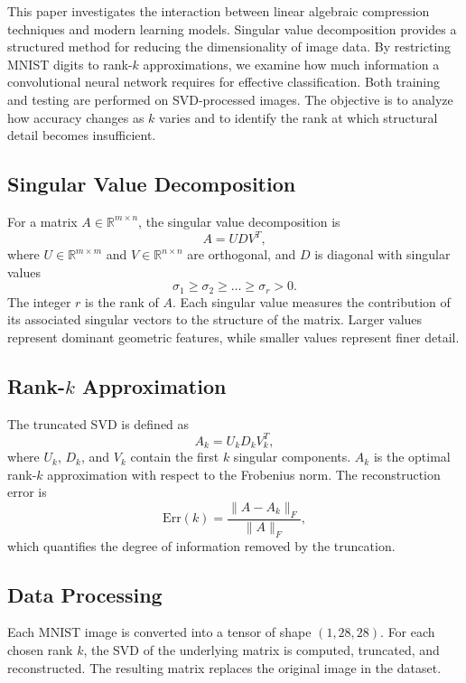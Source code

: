 \documentclass[11pt]{article}
\begin{document}
This paper investigates the interaction between linear algebraic compression techniques and modern learning models. Singular value decomposition provides a structured method for reducing the dimensionality of image data. By restricting MNIST digits to rank-\(k\) approximations, we examine how much information a convolutional neural network requires for effective classification. Both training and testing are performed on SVD-processed images. The objective is to analyze how accuracy changes as \(k\) varies and to identify the rank at which structural detail becomes insufficient.

\subsection*{Singular Value Decomposition}
For a matrix \(A \in \mathbb{R}^{m \times n}\), the singular value decomposition is
\[
A = U D V^{T},
\]
where \(U \in \mathbb{R}^{m \times m}\) and \(V \in \mathbb{R}^{n \times n}\) are orthogonal, and $D$  is diagonal with singular values
\[
\sigma_1 \ge \sigma_2 \ge \dots \ge \sigma_r > 0.
\]
The integer \(r\) is the rank of \(A\). Each singular value measures the contribution of its associated singular vectors to the structure of the matrix. Larger values represent dominant geometric features, while smaller values represent finer detail.

\subsection*{Rank-\(k\) Approximation}
The truncated SVD is defined as
\[
A_k = U_k D_k V_k^{T},
\]
where \(U_k\), \(D_k\), and \(V_k\) contain the first \(k\) singular components. \(A_k\) is the optimal rank-\(k\) approximation with respect to the Frobenius norm. The reconstruction error is
\[
\mathrm{Err}(k) = \frac{\|A - A_k\|_{F}}{\|A\|_{F}},
\]
which quantifies the degree of information removed by the truncation.
\pagebreak{}
\subsection*{Data Processing}
Each MNIST image is converted into a tensor of shape \((1,28,28)\). For each chosen rank \(k\), the SVD of the underlying matrix is computed, truncated, and reconstructed. The resulting matrix replaces the original image in the dataset.
\end{document}
